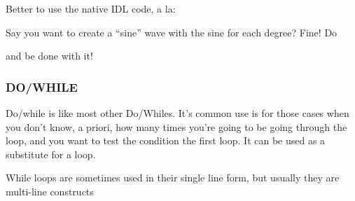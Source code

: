     Better to use the native IDL code, a la:



  Say you  want to create a ``sine'' wave with the sine for each degree? Fine! Do 



   and be done with it!


  \subsubsection{DO/WHILE}\label{sec:qs-Do-While}

    Do/while is like most other Do/Whiles. It's common use is for
  those cases when you don't know, a priori, how many times you're going
  to be going through the loop, and you want to test the condition
   the first loop. It can be used as a substitute for a
   loop.

   While loops are sometimes used in their single line form, but
  usually they are multi-line constructs

